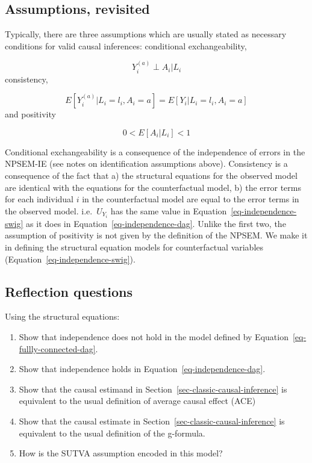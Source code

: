 \documentclass[
  letterpaper,
  DIV=11,
  numbers=noendperiod,
  oneside]{scrreprt}
\begin{document}
\hypertarget{assumptions-revisited}{%
\subsection{Assumptions, revisited}\label{assumptions-revisited}}

Typically, there are three assumptions which are usually stated as
necessary conditions for valid causal inferences: conditional
exchangeability,

\[
Y_i^{(a)} \perp A_i | L_i
\] consistency,

\[
E[Y_i^{(a)} | L_i = l_i, A_i = a] =  E[Y_i | L_i = l_i, A_i = a]
\] and positivity

\[
0 < E[A_i | L_i] < 1
\]

Conditional exchangeability is a consequence of the independence of
errors in the NPSEM-IE (see notes on identification assumptions above).
Consistency is a consequence of the fact that a) the structural
equations for the observed model are identical with the equations for
the counterfactual model, b) the error terms for each individual \(i\)
in the counterfactual model are equal to the error terms in the observed
model. i.e.~\(U_{Y_i}\) has the same value in
Equation~\ref{eq-independence-swig} as it does in
Equation~\ref{eq-independence-dag}. Unlike the first two, the assumption
of positivity is not given by the definition of the NPSEM. We make it in
defining the structural equation models for counterfactual variables
(Equation~\ref{eq-independence-swig}).

\hypertarget{reflection-questions}{%
\subsection*{Reflection questions}\label{reflection-questions}}

Using the structural equations:

\begin{enumerate}
\def\labelenumi{\arabic{enumi}.}
\item
  Show that independence does not hold in the model defined by
  Equation~\ref{eq-fullly-connected-dag}.
\item
  Show that independence holds in Equation~\ref{eq-independence-dag}.
\item
  Show that the causal estimand in
  Section~\ref{sec-classic-causal-inference} is equivalent to the usual
  definition of average causal effect (ACE)
\item
  Show that the causal estimate in
  Section~\ref{sec-classic-causal-inference} is equivalent to the usual
  definition of the g-formula.
\item
  How is the SUTVA assumption encoded in this model?
\end{enumerate}
\end{document}
